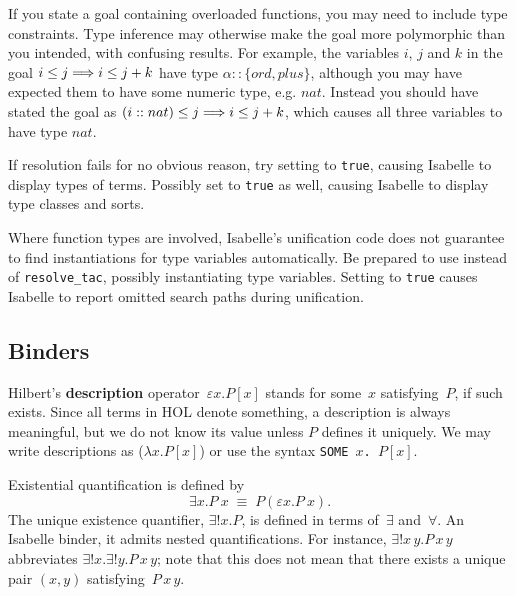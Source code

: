 If you state a goal containing overloaded functions, you may need to include
type constraints.  Type inference may otherwise make the goal more
polymorphic than you intended, with confusing results.  For example, the
variables $i$, $j$ and $k$ in the goal $i \leq j \Longrightarrow i \leq j+k$ have type
$\alpha::\{ord,plus\}$, although you may have expected them to have some
numeric type, e.g. $nat$.  Instead you should have stated the goal as
$(i::nat) \leq j \Longrightarrow i \leq j+k$, which causes all three variables to have
type $nat$.

\begin{warn}
  If resolution fails for no obvious reason, try setting
   to \texttt{true}, causing Isabelle to display
  types of terms.  Possibly set  to \texttt{true} as
  well, causing Isabelle to display type classes and sorts.

  Where function types are involved, Isabelle's unification code does not
  guarantee to find instantiations for type variables automatically.  Be
  prepared to use  instead of \texttt{resolve_tac},
  possibly instantiating type variables.  Setting
   to \texttt{true} causes Isabelle to report
  omitted search paths during unification.
\end{warn}


\subsection{Binders}

Hilbert's {\bf description} operator~$\varepsilon x. P[x]$ stands for some~$x$
satisfying~$P$, if such exists.  Since all terms in HOL denote something, a
description is always meaningful, but we do not know its value unless $P$
defines it uniquely.  We may write descriptions as ($\lambda x.
P[x]$) or use the syntax \hbox{\tt SOME~$x$.~$P[x]$}.

Existential quantification is defined by
\[ \exists x. P~x \;\equiv\; P(\varepsilon x. P~x). \]
The unique existence quantifier, $\exists!x. P$, is defined in terms
of~$\exists$ and~$\forall$.  An Isabelle binder, it admits nested
quantifications.  For instance, $\exists!x\,y. P\,x\,y$ abbreviates
$\exists!x. \exists!y. P\,x\,y$; note that this does not mean that there
exists a unique pair $(x,y)$ satisfying~$P\,x\,y$.

\medskip

